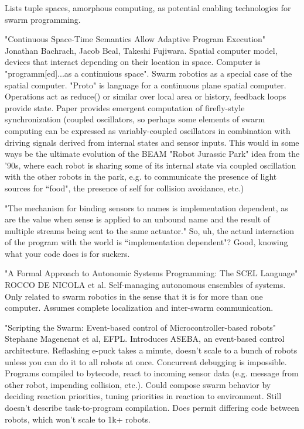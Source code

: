 \documentclass[]{article}
\begin{document}
Lists tuple spaces, amorphous computing, as potential enabling technologies for swarm programming. 

"Continuous Space-Time Semantics Allow Adaptive Program Execution" \cite{bachrach2007continuous} Jonathan Bachrach, Jacob Beal, Takeshi Fujiwara. Spatial computer model, devices that interact depending on their location in space. Computer is "programm[ed]...as a continuious space". Swarm robotics as a special case of the spatial computer. "Proto" is language for a continuous plane spatial computer. Operations act as reduce() or similar over local area or history, feedback loops provide state. Paper provides emergent computation of firefly-style synchronization (coupled oscillators, so perhaps some elements of swarm computing can be expressed as variably-coupled oscillators in combination with driving signals derived from internal states and sensor inputs. This would in some ways be the ultimate evolution of the BEAM "Robot Jurassic Park" idea from the '90s, where each robot is sharing some of its internal state via coupled oscillation with the other robots in the park, e.g. to communicate the presence of light sources for ``food", the presence of self for collision avoidance, etc.)

"The mechanism for binding sensors to names is implementation dependent, as are the value when sense is applied to an unbound name and the result of multiple streams being sent to the same actuator." So, uh, the actual interaction of the program with the world is ``implementation dependent"? Good, knowing what your code does is for suckers. 

"A Formal Approach to Autonomic Systems Programming: The SCEL Language" \cite{nicola2014formal} ROCCO DE NICOLA et al. Self-managing autonomous ensembles of systems. Only related to swarm robotics in the sense that it is for more than one computer. Assumes complete localization and inter-swarm communication. 

"Scripting the Swarm: Event-based control of Microcontroller-based robots" \cite{magnenat2008scripting} Stephane Magenenat et al, EFPL. Introduces ASEBA, an event-based control architecture. Reflashing e-puck takes a minute, doesn't scale to a bunch of robots unless you can do it to all robots at once. Concurrent debugging is impossible. Programs compiled to bytecode, react to incoming sensor data (e.g. message from other robot, impending collision, etc.). Could compose swarm behavior by deciding reaction priorities, tuning priorities in reaction to environment. Still doesn't describe task-to-program compilation. Does permit differing code between robots, which won't scale to 1k+ robots.
\end{document}
